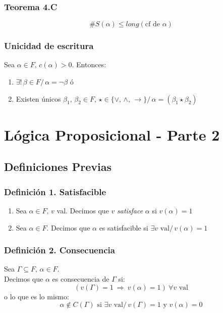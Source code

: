 \documentclass{article}
\newcommand{\comma}{,\,}                                %
\newcommand{\tq}{/\,}                                   %
\newcommand{\Rightarrows}{\: \Rightarrow \:}            %
\newcommand{\existsuniq}{\exists !\,}                   %
\begin{document}
\subsubsection{Teorema 4.C}
\begin{equation*}
    \#S(\alpha) \leq long(\text{cf de } \alpha)
\end{equation*}

\subsubsection{Unicidad de escritura}
Sea $\alpha \in F \comma c(\alpha) > 0$. Entonces:
\begin{enumerate}
	\item $\existsuniq \beta \in F \tq \alpha = \neg \beta$ ó
	\item Existen únicos $\beta_1 \comma \beta_2 \in F \comma \star \in \{ \vee \comma \wedge \comma 
		\rightarrow \} \tq \alpha = ( \beta_1 \star \beta_2 )$
\end{enumerate}

\newpage
\section{Lógica Proposicional - Parte 2}
\subsection{Definiciones Previas}
\subsubsection*{Definición 1. Satisfacible}
\begin{enumerate}
    \item Sea $\alpha \in F \comma v$ val. Decimos que $v$ \emph{satisface} $\alpha$ si $v(\alpha) = 1$
    \item Sea $\alpha \in F$. Decimos que $\alpha$ es satisfacible si $\exists v \text{ val} \tq v(\alpha) = 1$
\end{enumerate}

\subsubsection*{Definición 2. Consecuencia}
Sea $\Gamma \subseteq F \comma \alpha \in F$.
\\Decimos que $\alpha$ es consecuencia de $\Gamma$ si:
\begin{equation*}
    ( v(\Gamma) = 1 \Rightarrows v(\alpha) = 1 ) \: \forall v \text{ val}
\end{equation*}
o lo que es lo mismo:
\begin{equation*}
    \alpha \notin C(\Gamma) \text{ si } \exists v \text{ val} \tq v(\Gamma) = 1 \text{ y } v(\alpha) = 0
\end{equation*}
\end{document}
